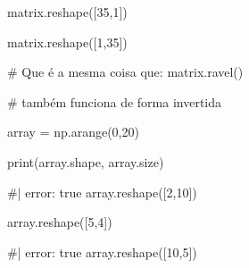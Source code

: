 \documentclass[
  letterpaper,
  DIV=11,
  numbers=noendperiod]{scrreprt}
\newenvironment{Shaded}{\begin{snugshade}}{\end{snugshade}}
\newcommand{\NormalTok}[1]{\textcolor[rgb]{0.00,0.23,0.31}{#1}}
\begin{document}
\begin{Shaded}
\begin{Highlighting}[]
\NormalTok{matrix.reshape([35,1])}
\end{Highlighting}
\end{Shaded}

\begin{Shaded}
\begin{Highlighting}[]
\NormalTok{matrix.reshape([1,35])}
\end{Highlighting}
\end{Shaded}

\begin{Shaded}
\begin{Highlighting}[]
\NormalTok{\# Que é a mesma coisa que:}
\NormalTok{matrix.ravel()}
\end{Highlighting}
\end{Shaded}

\begin{Shaded}
\begin{Highlighting}[]
\NormalTok{\# também funciona de forma invertida}

\NormalTok{array = np.arange(0,20)}
\end{Highlighting}
\end{Shaded}

\begin{Shaded}
\begin{Highlighting}[]
\NormalTok{print(array.shape, array.size)}
\end{Highlighting}
\end{Shaded}

\begin{Shaded}
\begin{Highlighting}[]
\NormalTok{\#| error: true}
\NormalTok{array.reshape([2,10])}
\end{Highlighting}
\end{Shaded}

\begin{Shaded}
\begin{Highlighting}[]
\NormalTok{array.reshape([5,4])}
\end{Highlighting}
\end{Shaded}

\begin{Shaded}
\begin{Highlighting}[]
\NormalTok{\#| error: true}
\NormalTok{array.reshape([10,5])}
\end{Highlighting}
\end{Shaded}
\end{document}
